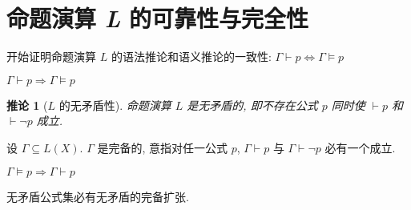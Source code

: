 \documentclass[
    mode=hazy,
    color=blue,
    device=normal,
    lang=cn
]{elegantnote}
\newtheorem{deduction}{推论}[section]
\begin{document}
\section{命题演算 \textit{L} 的可靠性与完全性}
开始证明命题演算 $L$ 的语法推论和语义推论的一致性: $\Gamma\vdash p\Leftrightarrow\Gamma\vDash p$
\begin{theorem}[$L$ 的可靠性]
    $\Gamma\vdash p\Rightarrow\Gamma\vDash p$
\end{theorem}
\begin{deduction}[$L$ 的无矛盾性]
    命题演算 $L$ 是无矛盾的, 即不存在公式 $p$ 同时使 $\vdash p$ 和 $\vdash \lnot p$ 成立.
\end{deduction}
\begin{definition}[公式集的完备性]
    设 $\Gamma\subseteq L(X)$. $\Gamma$ 是完备的, 意指对任一公式 $p$, $\Gamma\vdash p$ 与 $\Gamma\vdash\lnot p$ 必有一个成立.
\end{definition}
\begin{theorem}[$L$ 的完全性]
    $\Gamma\vDash p\Rightarrow \Gamma\vdash p$
\end{theorem}
\begin{proposition}
    无矛盾公式集必有无矛盾的完备扩张.
\end{proposition}
\end{document}
